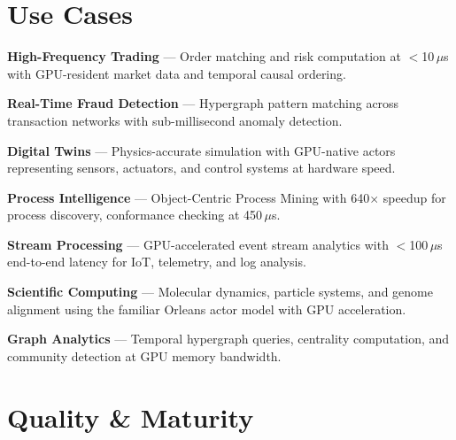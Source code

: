 \documentclass[11pt,a4paper]{article}
\begin{document}
\section{Use Cases}

\begin{tcolorbox}[keybox={Primary Use Cases}]
\begin{description}[leftmargin=1em, labelwidth=1em, font=\color{brand}\bfseries]
  \item[$\blacktriangleright$] \textbf{High-Frequency Trading} ---
    Order matching and risk computation at $<$10\,$\mu$s with GPU-resident
    market data and temporal causal ordering.

  \item[$\blacktriangleright$] \textbf{Real-Time Fraud Detection} ---
    Hypergraph pattern matching across transaction networks with
    sub-millisecond anomaly detection.

  \item[$\blacktriangleright$] \textbf{Digital Twins} ---
    Physics-accurate simulation with GPU-native actors representing
    sensors, actuators, and control systems at hardware speed.

  \item[$\blacktriangleright$] \textbf{Process Intelligence} ---
    Object-Centric Process Mining with 640$\times$ speedup for process
    discovery, conformance checking at 450\,$\mu$s.

  \item[$\blacktriangleright$] \textbf{Stream Processing} ---
    GPU-accelerated event stream analytics with $<$100\,$\mu$s end-to-end
    latency for IoT, telemetry, and log analysis.

  \item[$\blacktriangleright$] \textbf{Scientific Computing} ---
    Molecular dynamics, particle systems, and genome alignment using
    the familiar Orleans actor model with GPU acceleration.

  \item[$\blacktriangleright$] \textbf{Graph Analytics} ---
    Temporal hypergraph queries, centrality computation, and community
    detection at GPU memory bandwidth.
\end{description}
\end{tcolorbox}

\newpage
\section{Quality \& Maturity}
\end{document}
